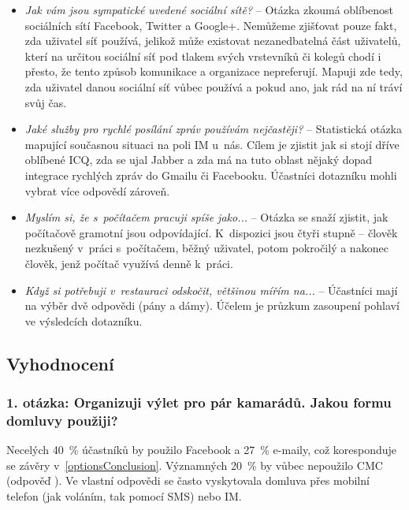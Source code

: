 \documentclass[12pt,oneside,final]{fithesis2}
\begin{document}
\begin{itemize}
    \item \emph{Jak vám jsou sympatické uvedené sociální sítě?} --
        Otázka zkoumá oblíbenost sociálních sítí Facebook, Twitter a Google+. Nemůžeme zjišťovat pouze fakt, zda uživatel síť používá, jelikož může existovat nezanedbatelná část uživatelů, kterí na určitou sociální síť pod tlakem svých vrstevníků či kolegů chodí i přesto, že tento způsob komunikace a organizace nepreferují. Mapuji zde tedy, zda uživatel danou sociální síť vůbec používá a pokud ano, jak rád na ní tráví svůj čas.

    \item \emph{Jaké služby pro rychlé posílání zpráv používám nejčastěji?} --
        Statistická otázka mapující současnou situaci na poli IM u~nás. Cílem je zjistit jak si stojí dříve oblíbené ICQ, zda se ujal Jabber a zda má na tuto oblast nějaký dopad integrace rychlých zpráv do Gmailu či Facebooku. Účastníci dotazníku mohli vybrat více odpovědí zároveň.

    \item \emph{Myslím si, že s~počítačem pracuji spíše jako...} --
        Otázka se snaží zjistit, jak počítačově gramotní jsou odpovídající. K~dispozici jsou čtyři stupně -- člověk nezkušený v~práci s~počítačem, běžný uživatel, potom pokročilý a nakonec člověk, jenž počítač využívá denně k~práci.

    \item \emph{Když si potřebuji v~restauraci odskočit, většinou mířím na...} --
        Účastníci mají na výběr dvě odpovědi (pány a dámy). Účelem je průzkum zasoupení pohlaví ve výsledcích dotazníku.
\end{itemize}

\subsection{Vyhodnocení}

\subsubsection*{\textbf{1. otázka: Organizuji výlet pro pár kamarádů. Jakou formu domluvy použiji?}}
Necelých 40~\% účastníků by použilo Facebook a 27~\% e-maily, což koresponduje se závěry v~\ref{optionsConclusion}. Významných 20~\% by vůbec nepoužilo CMC (odpověď ). Ve vlastní odpovědi se často vyskytovala domluva přes mobilní telefon (jak voláním, tak pomocí SMS) nebo IM.
\end{document}
